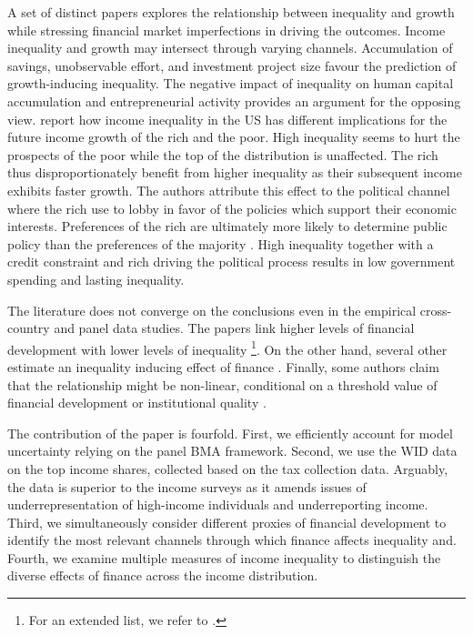 \begin{refsection}
A set of distinct papers explores the relationship between inequality and growth while stressing financial market imperfections in driving the outcomes. Income inequality and growth may intersect through varying channels. Accumulation of savings, unobservable effort, and investment project size favour the prediction of growth-inducing inequality. The negative impact of inequality on human capital accumulation and entrepreneurial activity provides an argument for the opposing view. 
\textcite{milanovicvan2018inequality} report how income inequality in the US has different implications for the future income growth of the rich and the poor. High inequality seems to hurt the prospects of the poor while the top of the distribution is unaffected. The rich thus disproportionately benefit from higher inequality as their subsequent income exhibits faster growth. The authors attribute this effect to the political channel where the rich use to lobby in favor of the policies which support their economic interests. Preferences of the rich are ultimately more likely to determine public policy than the preferences of the majority \parencite{gilens_page_2014}. High inequality together with a credit constraint and rich driving the political process results in low government spending and lasting inequality.

The literature does not converge on the conclusions even in the empirical cross-country and panel data studies. The papers link higher levels of financial development with lower levels of inequality \parencite{beck2007finance, hamori2012, gimet2011closer, kunieda2014finance}\footnote{For an extended list, we refer to \textcite{de2017finance}.}. On the other hand, several other estimate an inequality inducing effect of finance \parencite{Jaumotte2013, jauch2016financial, de2017finance}. Finally, some authors claim that the relationship might be non-linear, conditional on a threshold value of financial development \parencite{kim2011nonlinearity,tan2012nonlinear} or institutional quality \parencite{LawSingh2014, delis2014}.

The contribution of the paper is fourfold. First, we efficiently account for model uncertainty relying on the panel \ac{BMA} framework. Second, we use the \ac{WID} data on the top income shares, collected based on the tax collection data. Arguably, the data is superior to the income surveys as it amends issues of underrepresentation of high-income individuals and underreporting income. Third, we simultaneously consider different proxies of financial development to identify the most relevant channels through which finance affects inequality and. Fourth, we examine multiple measures of income inequality to distinguish the diverse effects of finance across the income distribution. 


\end{refsection}
